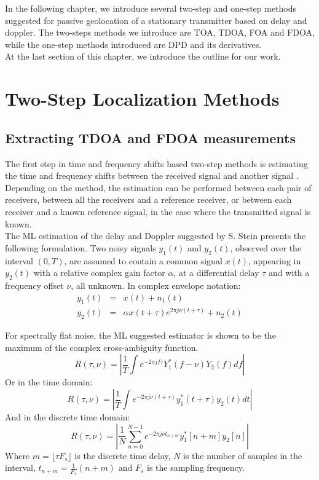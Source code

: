 In the following chapter, we introduce several two-step and one-step methods suggested for passive geolocation of a stationary transmitter based on delay and doppler.
The two-steps methods we introduce are TOA, TDOA, FOA and FDOA, while the one-step methods introduced are DPD and its derivatives.\\
At the last section of this chapter, we introduce the outline for our work.

\section{Two-Step Localization Methods}
\subsection{Extracting TDOA and FDOA measurements}
The first step in time and frequency shifts based two-step methods is estimating the time and frequency shifts between the received signal and another signal \cite{stein, knapp_carter}. Depending on the method, the estimation can be performed between each pair of receivers, between all the receivers and a reference receiver, or between each receiver and a known reference signal, in the case where the transmitted signal is known.\\

The ML estimation of the delay and Doppler suggested by S. Stein \cite{stein} presents the following formulation.
Two noisy signals $y_1(t)$ and $y_2(t)$, observed over the interval $(0,T)$, are assumed to contain a common signal $x(t)$, appearing in $y_2(t)$ with a relative complex gain factor $\alpha$, at a differential delay $\tau$ and with a frequency offset $\nu$, all unknown. In complex envelope notation:
\begin{eqnarray}
y_1(t) &=& x(t)+n_1(t)\\
y_2(t) &=& \alpha x(t+\tau)e^{2 \pi j \nu (t+\tau)} + n_2(t) \nonumber
\end{eqnarray}

For spectrally flat noise, the ML suggested estimator is shown to be the maximum of the complex cross-ambiguity function.
\begin{equation}
R(\tau,\nu) = \left|\frac{1}{T}\int e^{-2 \pi j f \tau} Y_1^*(f-\nu)Y_2(f)df\right|
\end{equation}
Or in the time domain:
\begin{equation}
R(\tau,\nu) = \left|\frac{1}{T}\int e^{-2 \pi j \nu (t+\tau)} y_1^*(t+\tau)y_2(t)dt\right|
\end{equation}
And in the discrete time domain:
\begin{equation}
R(\tau,\nu) = \left|\frac{1}{N} \sum_{n=0}^{N-1} e^{-2 \pi j \nu t_{n+m}} y_1^*[n+m]y_2[n]\right|
\end{equation}
Where $m=\lfloor \tau F_s \rfloor$ is the discrete time delay, $N$ is the number of samples in the interval, $t_{n+m} = \frac{1}{F_s}(n+m)$ and $F_s$ is the sampling frequency.

